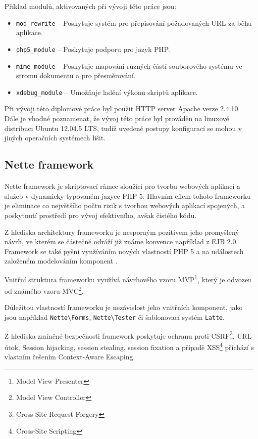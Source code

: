 \documentclass[11pt,oneside]{fithesis}
\begin{document}
        Příklad modulů, aktivovaných při vývoji této práce jsou:
        \begin{itemize}
        \item \verb|mod_rewrite| -- Poskytuje systém pro přepisování požadovaných URL za běhu aplikace. 
        \item \verb|php5_module| -- Poskytuje podporu pro jazyk PHP.
        \item \verb|mime_module| -- Poskytuje mapování různých částí souborového systému ve stromu dokumentu a pro přesměrování.
        \item \verb|xdebug_module| -- Umožňuje ladění výkonu skriptů aplikace.
        \end{itemize}

        Při vývoji této diplomové práce byl použit HTTP server Apache verze 2.4.10. Dále je vhodné poznamenat, že vývoj této práce byl prováděn na linuxové distribuci Ubuntu 12.04.5 LTS, tudíž uvedené postupy konfigurací se mohou v jiných operačních systémech lišit. 

        \subsection{Nette framework}
        \paragraph*{}
        Nette framework je skriptovací rámec sloužící pro tvorbu webových aplikací a služeb v dynamicky typovaném jazyce PHP 5. Hlavním cílem tohoto frameworku je eliminace co největšího počtu rizik s tvorbou webových aplikací spojených, a poskytnutí prostředí pro vývoj efektivního, avšak čistého kódu. 

        Z hlediska architektury frameworku je nesporným pozitivem jeho promyšlený návrh, ve kterém se částečně odráží již známe konvence například z EJB 2.0. Framework se také pyšní využíváním nových vlastností PHP 5 a na událostech založeném modelováním komponent \cite{nette}. 

        Vnitřní struktura frameworku využívá návrhového vzoru MVP\footnote{Model View Presenter}, který je odvozen od známého vzoru MVC\footnote{Model View Controller}. 

        Důležitou vlastností frameworku je nezávislost jeho vnitřních komponent, jako jsou například \verb|Nette\Forms|, \verb|Nette\Tester| či šablonovací systém \verb|Latte|.

        Z hlediska zmíněné bezpečnosti framework poskytuje ochranu proti CSRF\footnote{Cross-Site Request Forgery}, URL útok, Session hijacking, session stealing, session fixation a případě XSS\footnote{Cross-Site Scripting} přichází s vlastním řešením Context-Aware Escaping.
\end{document}
